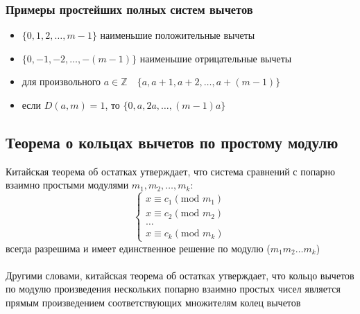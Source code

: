 \documentclass[12pt]{article}
\begin{document}
\subsubsection{Примеры простейших полных систем вычетов}
\begin{itemize}
    \item $\{0, 1, 2, \dots, m-1\}$ наименьшие положительные вычеты
    \item $\{0, -1, -2, \dots, -(m-1)\}$ наименьшие отрицательные вычеты
    \item для произвольного $a \in \mathbb{Z} \quad\{a, a+1, a+2, \dots, a+(m-1)\}$
    \item если $D(a,m) = 1$, то $\{0, a, 2a, \dots, (m-1)a\}$
\end{itemize}

\subsection{Теорема о кольцах вычетов по простому модулю}

Китайская теорема об остатках утверждает, что система сравнений с попарно взаимно простыми модулями
$m_1, m_2, \dots, m_k$:\\
\begin{equation*}
    \begin{cases}
        x \equiv c_1  (\text{mod } m_1) \\
        x \equiv c_2 (\text{mod } m_2)  \\
        \dots                           \\
        x \equiv c_k (\text{mod } m_k)
    \end{cases}
\end{equation*}
всегда разрешима и имеет единственное решение по модулю ($m_1m_2\dots m_k$)\\
\\
Другими словами, китайская теорема об остатках утверждает, что кольцо вычетов по модулю произведения нескольких попарно взаимно простых чисел является прямым произведением соответствующих множителям колец вычетов
\end{document}
